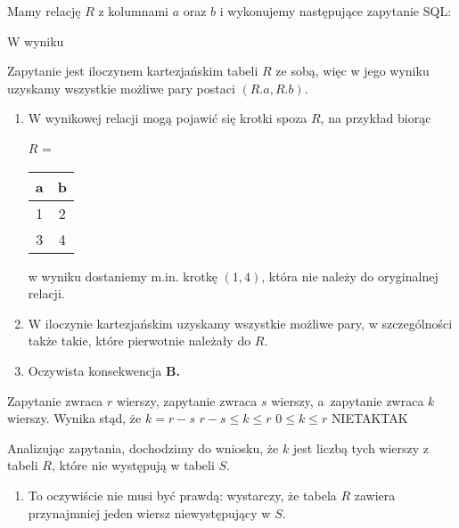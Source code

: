 \begin{solutions}
    \sol Mamy relację $R$ z kolumnami $a$ oraz $b$ i wykonujemy następujące zapytanie SQL:
    \begin{center}
    \end{center}
    W wyniku
    
    Zapytanie jest iloczynem kartezjańskim tabeli $R$ ze sobą, więc w jego wyniku uzyskamy wszystkie możliwe pary postaci $(R.a, R.b)$.
    
    \begin{enumerate}[\bf A.]
    	\item W wynikowej relacji mogą pojawić się krotki spoza $R$, na przykład biorąc
    	\begin{center}
    		$R$ = \begin{tabular}{c|c}
    			a & b \\ \hline
    			1 & 2 \\
    			3 & 4                        
    		\end{tabular}
    	\end{center}
    	w wyniku dostaniemy m.in. krotkę $(1, 4)$, która nie należy do oryginalnej relacji.
    	
    	\item W iloczynie kartezjańskim uzyskamy wszystkie możliwe pary, w szczególności także takie, które pierwotnie należały do $R$.
    	
    	\item Oczywista konsekwencja \textbf{B.}
    \end{enumerate}

    \sol Zapytanie  zwraca $r$ wierszy, zapytanie  zwraca $s$ wierszy, a~zapytanie  zwraca $k$ wierszy. Wynika stąd, że
    \answerss
    {$k = r - s$}
    {$r - s \leq k \leq r$}
    {$0 \leq k \leq r$}
    {NIE}{TAK}{TAK}
    
    Analizując zapytania, dochodzimy do wniosku, że $k$ jest liczbą tych wierszy z tabeli $R$, które nie występują w tabeli $S$.
    
    \begin{enumerate}[\bf A.]
    	\item To oczywiście nie musi być prawdą: wystarczy, że tabela $R$ zawiera przynajmniej jeden wiersz niewystępujący w $S$.
    	

\end{enumerate}
\end{solutions}
